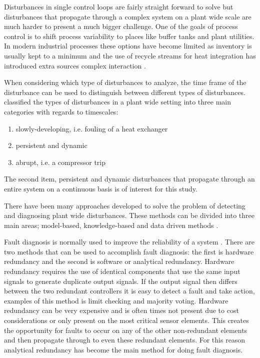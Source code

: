 Disturbances in single control loops are fairly straight forward to solve but disturbances that propagate through a complex system on a plant wide scale are much harder to present a much bigger challenge. One of the goals of process control is to shift process variability to places like buffer tanks and plant utilities. In modern industrial processes these options have become limited as inventory is usually kept to a minimum and the use of recycle streams for heat integration has introduced extra sources complex interaction \cite{thornhill2007advances}.

When considering which type of disturbances to analyze, the time frame of the disturbance can be used to distinguish between different types of disturbances. \cite{thornhill2007advances} classified the types of disturbances in a plant wide setting into three main categories with regards to timescales:
\begin{enumerate}
	\item slowly-developing, i.e. fouling of a heat exchanger
	\item persistent and dynamic
	\item abrupt, i.e. a compressor trip
\end{enumerate}
The second item, persistent and dynamic disturbances that propagate through an entire system on a continuous basis is of interest for this study.

There have been many approaches developed to solve the problem of detecting and diagnosing plant wide disturbances. These methods can be divided into three main areas; model-based, knowledge-based and data driven methods \cite{jiang2019review}.

Fault diagnosis is normally used to improve the reliability of a system \cite{gao2015survey}. There are two methods that can be used to accomplish fault diagnosis: the first is hardware redundancy and the second is software or analytical redundancy. Hardware redundancy requires the use of identical components that use the same input signals to generate duplicate output signals. If the output signal then differs between the two redundant controllers it is easy to detect a fault and take action, examples of this method is limit checking and majority voting. Hardware redundancy can be very expensive and is often times not present due to cost considerations or only present on the most critical sensor elements. This creates the opportunity for faults to occur on any of the other non-redundant elements and then propagate through to even these redundant elements. For this reason analytical redundancy has become the main method for doing fault diagnosis. 

